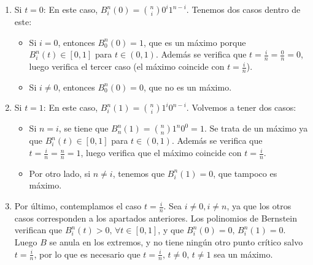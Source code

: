 \documentclass[12pt,a4paper]{article}
\begin{document}
\begin{enumerate}
\item Si $t=0$: En este caso, $B_i^n(0)=\binom{n}{i}0^i 1^{n-i}$. Tenemos
  dos casos dentro de este:
  \begin{itemize}
  \item Si $i=0$, entonces $B_0^n(0)=1$, que es un
	máximo porque $B_i^n(t)\in \left [ 0,1 \right ]$ para $t\in (0,1)$.
	Además se verifica que $t=\frac{i}{n}=\frac{0}{n}=0$, luego verifica el
	tercer caso (el máximo coincide con $t=\frac{i}{n}$).
  \item Si $i\neq 0$, entonces $B_0^n(0)=0$, que no es un máximo.
  \end{itemize}
\item Si $t=1$: En este caso, $B_i^n(1)=\binom{n}{i}1^i 0^{n-i}$. Volvemos
  a tener dos casos:
  \begin{itemize}
  \item Si $n=i$, se tiene que $B_n^n(1) = \binom{n}{n} 1^n 0^0 = 1$. Se trata de
	un máximo ya que $B_i^n(t) \in \left [ 0,1 \right ]$ para $t\in
	(0,1)$. Además se verifica que $t=\frac{i}{n}=\frac{n}{n} = 1$, luego
	verifica que el máximo coincide con $t=\frac{i}{n}$.
  \item Por otro lado, si $n \neq i$, tenemos que $B_i^n(1) = 0$, que tampoco es máximo.
  \end{itemize}
\item Por último, contemplamos el caso $t=\frac{i}{n}$. Sea $i \neq 0, i
  \neq n$, ya que los otros casos corresponden a los apartados
  anteriores. Los polinomios de Bernstein verifican que $ B_{i}^{n}(t)
  > 0,\,\forall t \in [0,1]$, y que $B_{i}^{n}(0) = 0,\,
  B_{i}^{n}(1)=0$. Luego $B$ se anula en los extremos, y no tiene ningún otro punto
  crítico salvo $t=\frac{i}{n}$, por lo que es necesario que
  $t=\frac{i}{n},\,t\neq 0,\,t \neq1$ sea un máximo.

\end{enumerate}
\end{document}
